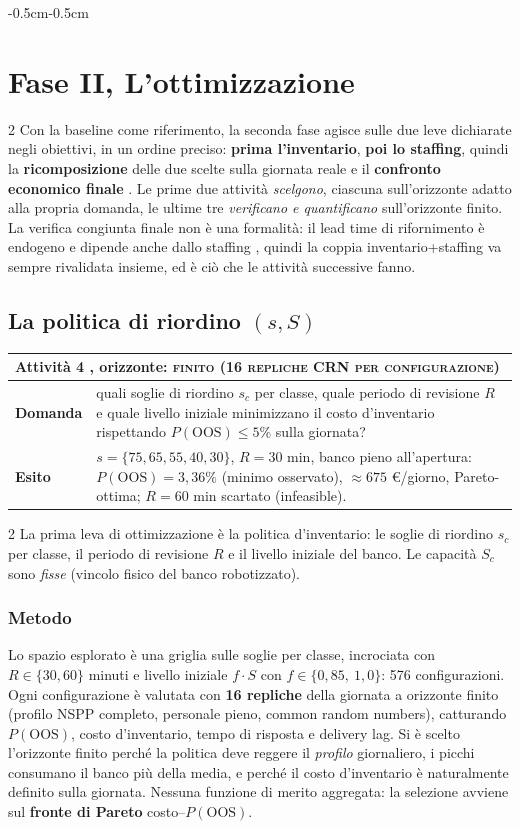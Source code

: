 \documentclass{article}
\newcommand{\schedaattivita}[4]{%
\noindent
{\renewcommand{\arraystretch}{1.25}%
\begin{tabularx}{\linewidth}{|p{2.2cm}|X|}
\hline
\multicolumn{2}{|l|}{\textbf{Attività #1} \;,  \; orizzonte: \textbf{\textsc{#2}}} \\
\hline
\textbf{Domanda} & #3 \\
\hline
\textbf{Esito} & #4 \\
\hline
\end{tabularx}}\par\vspace{6pt}}
\begin{document}
\begin{adjustwidth}{-0.5cm}{-0.5cm}
\section{Fase II,  L'ottimizzazione}
\begin{multicols}{2}
Con la baseline come riferimento, la seconda fase agisce sulle due leve dichiarate negli
obiettivi, in un ordine preciso: \textbf{prima l'inventario}, \textbf{poi lo staffing}, quindi la
\textbf{ricomposizione} delle due scelte sulla giornata reale e il
\textbf{confronto economico finale} . Le prime due attività \emph{scelgono}, 
ciascuna sull'orizzonte adatto alla propria domanda,  le ultime tre \emph{verificano e
quantificano} sull'orizzonte finito. La verifica congiunta finale non è una formalità: il lead
time di rifornimento è endogeno e dipende anche dallo staffing , quindi la coppia inventario+staffing va sempre rivalidata insieme, ed è ciò che le
attività successive fanno.
\end{multicols}

\subsection{La politica di riordino $(s,S)$}
\schedaattivita{4}{finito (16 repliche CRN per configurazione)}%
{quali soglie di riordino $s_c$ per classe, quale periodo di revisione $R$ e quale livello
iniziale minimizzano il costo d'inventario rispettando $P(\text{OOS}) \le 5\%$ sulla giornata?}%
{$s = \{75,65,55,40,30\}$, $R = 30$ min, banco pieno all'apertura: $P(\text{OOS}) = 3{,}36\%$
(minimo osservato), $\approx 675$ \euro/giorno, Pareto-ottima; $R = 60$ min scartato (infeasible).}
\begin{multicols}{2}
La prima leva di ottimizzazione è la politica d'inventario: le soglie di riordino $s_c$ per
classe, il periodo di revisione $R$ e il livello iniziale del banco. Le capacità $S_c$ sono
\emph{fisse} (vincolo fisico del banco robotizzato).

\subsubsection*{Metodo}
Lo spazio esplorato è una griglia sulle soglie per classe, incrociata con
$R \in \{30, 60\}$ minuti e livello iniziale $f\cdot S$ con $f \in \{0{,}85,\ 1{,}0\}$: 576
configurazioni. Ogni configurazione è valutata con \textbf{16 repliche} della giornata a orizzonte
finito (profilo NSPP completo, personale pieno, common random numbers), catturando
$P(\text{OOS})$, costo d'inventario, tempo di risposta e delivery lag. Si è scelto l'orizzonte
finito perché la politica deve reggere il \emph{profilo} giornaliero,  i picchi consumano il
banco più della media,  e perché il costo d'inventario è naturalmente definito sulla giornata.
Nessuna funzione di merito aggregata: la selezione avviene sul \textbf{fronte di Pareto}
costo--$P(\text{OOS})$.


\end{multicols}
\end{adjustwidth}
\end{document}
